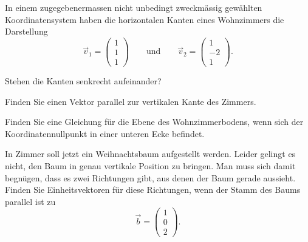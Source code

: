 In einem zugegebenermassen nicht unbedingt zweckmässig gewählten
Koordinatensystem haben die horizontalen Kanten eines Wohnzimmers
die Darstellung
\[
\vec v_1=\begin{pmatrix}
1\\1\\1
\end{pmatrix}
\qquad\text{und}\qquad
\vec v_2=\begin{pmatrix}
1\\-2\\1
\end{pmatrix}.
\]
\begin{teilaufgaben}
\item Stehen die Kanten senkrecht aufeinander?
\item Finden Sie einen Vektor parallel zur vertikalen Kante
des Zimmers.
\item Finden Sie eine Gleichung für die Ebene des Wohnzimmerbodens, wenn
sich der Koordinatennullpunkt in einer unteren Ecke befindet.
\item In Zimmer soll jetzt ein Weihnachtsbaum aufgestellt werden.
Leider gelingt es nicht, den Baum in genau vertikale Position zu
bringen. Man muss sich damit begnügen, dass es zwei Richtungen
gibt, aus denen der Baum gerade aussieht. Finden Sie Einheitsvektoren
für diese Richtungen,
wenn der Stamm des Baums parallel ist zu
\[
\vec b=\begin{pmatrix}
1\\0\\2
\end{pmatrix}.
\]
\end{teilaufgaben}


